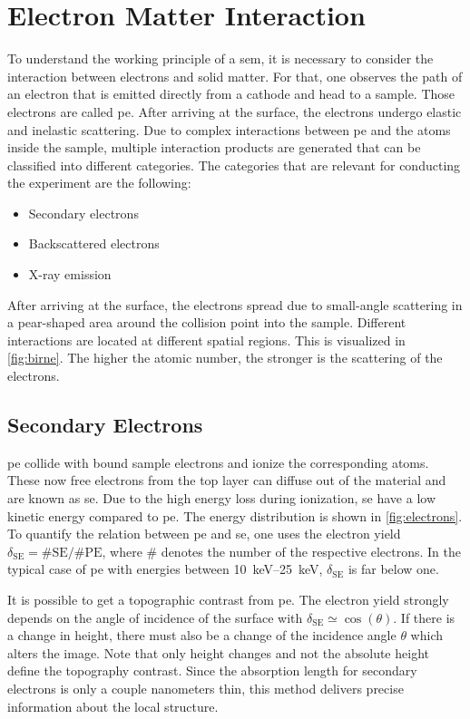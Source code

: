 \section{Electron Matter Interaction}
To understand the working principle of a \ac{sem}, it is necessary to consider the
interaction between electrons and solid matter.
For that, one observes the path of an electron that is emitted
directly from a cathode
and head to a sample. Those electrons are called \ac{pe}.
After arriving at the surface, the electrons undergo elastic and inelastic scattering.
Due to complex interactions between \ac{pe} and the atoms
inside the sample, multiple interaction products are generated that can
be classified into different categories.
The categories that are relevant for conducting the experiment are the
following:
\begin{itemize}
	\item Secondary electrons
	\item Backscattered electrons
	\item X-ray emission
\end{itemize}
After arriving at the surface, the electrons spread due to
small-angle scattering in a pear-shaped area around the collision point
into the sample.
Different interactions are located at different spatial regions.
This is visualized in \cref{fig:birne}.
The higher the atomic number, the stronger is the scattering of the
electrons.

\subsection{Secondary Electrons}
\ac{pe} collide with bound sample electrons and ionize the
corresponding atoms.
These now free electrons from the top layer can diffuse out of the
material and are known as \ac{se}.
Due to the high energy loss during ionization, \ac{se}
have a low kinetic energy compared to \ac{pe}.
The energy distribution is shown in \cref{fig:electrons}.
To quantify the relation between \ac{pe} and \ac{se}, one
uses the electron yield $\delta_\mathrm{SE} = \text{\# SE} /
	\text{\# PE}$, where $\#$ denotes the number of the respective electrons.
In the typical case of \ac{pe} with energies between
\qtyrange{10}{25}{\kilo\electronvolt}, $\delta_\text{SE}$ is far
below one.

It is possible to get a topographic contrast from \ac{pe}.
The electron yield strongly depends on the angle of incidence of
the surface with $\delta_\mathrm{SE} \simeq \cos(\theta)$.
If there is a change in height, there must also be a change of the
incidence angle $\theta$ which alters the image.
Note that only height changes and not the absolute height define the
topography contrast.
Since the absorption length for secondary electrons is only a couple nanometers thin,
this method delivers precise information
about the local structure.

